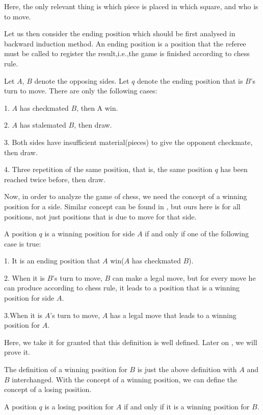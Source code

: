 Here, the only relevant thing is which piece is placed in which square, and who is to move. 

Let us then consider the ending position which should be first analysed in backward induction method. An ending position is a position that the referee must be called to register the result,i.e.,the game is finished according to chess rule.

 Let $A$, $B$ denote the opposing sides. Let $q$ denote the ending position that is $B$'s turn to move. There are only the following cases:

1. $A$ has checkmated $B$, then A win.

2. $A$ has stalemated $B$, then draw.

3. Both sides have insufficient material(pieces) to give the opponent checkmate, then draw.

4. Three repetition of the same position, that is, the same position $q$ has been reached twice before, then draw.

Now, in order to analyze the game of chess, we need the concept of a winning position for a side. Similar concept can be found in \parencite{walker2001}, but ours here is for all positions, 
not just positions that is due to move for that side.

\begin{definition} 


A position $q$ is a winning position for side $A$ if and only if one of the
following case is true:

1. It is an ending position that $A$ win($A$ has checkmated $B$).

2. When it is $B$'s turn to move, $B$ can make a legal move, but for
every move he can produce according to chess rule, it leads to a position that
is a winning position for side $A$.

 3.When it is $A$'s turn to move, $A$ has a legal
move that leads to a winning position for $A$.

\end{definition}

Here, we take it for granted that this definition is well
defined. Later on , we will prove it.

The definition of a winning position for $B$ is just the above definition with $A$ and $B$ interchanged.
With the concept of a winning position, we can define the concept of a losing
position.

\begin{definition}
A position $q$ is a losing position for $A$ if and only if it is a winning position for $B$.
\end{definition}


